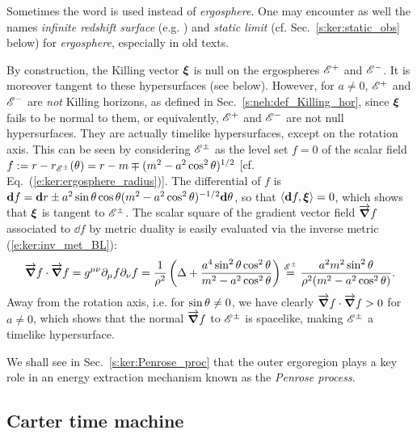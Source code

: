 \begin{remark} \label{r:ker:static_limit}
Sometimes the word  is used instead of
\emph{ergosphere}. One may encounter as well the names
\emph{infinite redshift surface} (e.g. \cite{Vishv68}) and
\emph{static limit} (cf. Sec.~\ref{s:ker:static_obs} below)
for \emph{ergosphere}, especially in old texts.
\end{remark}

\begin{remark}
By construction, the Killing vector $\bm{\xi}$ is null on the
ergospheres $\mathscr{E}^+$ and $\mathscr{E}^-$. It is moreover tangent to these
hypersurfaces (see below). However, for $a\neq 0$,
$\mathscr{E}^+$ and $\mathscr{E}^-$ are \emph{not} Killing horizons, as defined
in Sec.~\ref{s:neh:def_Killing_hor}, since
$\bm{\xi}$ fails to be normal to them, or equivalently, $\mathscr{E}^+$ and $\mathscr{E}^-$
are not null hypersurfaces. They are actually timelike hypersurfaces,
except on the rotation axis.
This can be seen by considering $\mathscr{E}^\pm$ as the level
set $f = 0$ of the scalar field
$f := r - r_{\mathscr{E}^\pm}(\theta) = r - m \mp (m^2 - a^2\cos^2\theta)^{1/2}$
[cf. Eq.~(\ref{e:ker:ergosphere_radius})].
The differential of $f$ is $\mathbf{d} f = \mathbf{d} r \pm a^2 \sin\theta \cos\theta
(m^2 - a^2\cos^2\theta)^{-1/2} \mathbf{d}\theta$, so that $\langle\mathbf{d} f, \bm{\xi} \rangle = 0$,
which shows that $\bm{\xi}$ is tangent to $\mathscr{E}^\pm$.
The scalar square of the gradient vector field
$\overrightarrow{\bm{\nabla}} f$ associated to $\dd f$ by metric duality
is easily evaluated via the inverse metric (\ref{e:ker:inv_met_BL}):
\[
    \overrightarrow{\bm{\nabla}} f\cdot \overrightarrow{\bm{\nabla}} f = g^{\mu\nu} \partial_\mu f \partial_\nu f
    = \frac{1}{\rho^2} \left( \Delta + \frac{a^4  \sin^2\theta\cos^2\theta}{m^2 - a^2\cos^2\theta} \right)
    \stackrel{\mathscr{E}^{\pm}}{=} \frac{a^2 m^2 \sin^2\theta}{\rho^2(m^2 - a^2\cos^2\theta)} .
\]
Away from the rotation axis, i.e. for $\sin\theta\neq 0$, we have clearly
$\overrightarrow{\bm{\nabla}} f\cdot \overrightarrow{\bm{\nabla}} f > 0$ for $a\neq 0$, which shows that the normal
$\overrightarrow{\bm{\nabla}} f$ to $\mathscr{E}^{\pm}$ is spacelike, making $\mathscr{E}^{\pm}$ a timelike
hypersurface.
\end{remark}

We shall see in Sec.~\ref{s:ker:Penrose_proc} that the outer ergoregion
plays a key role in an energy extraction mechanism known as the
\emph{Penrose process}.

\subsection{Carter time machine} \label{s:ker:time_machine}

